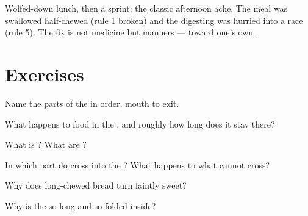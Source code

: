 \begin{example}\label{ex:g4:journey-of-food:ache}
Wolfed-down lunch, then a sprint: the classic afternoon
 ache. The meal was swallowed half-chewed (rule 1
broken) and the digesting  was hurried into a race
(rule 5). The fix is not medicine but manners --- toward
one's own .
\end{example}

\section{Exercises}

\begin{exercise}[$\star$]\label{exo:g4:journey-of-food:1}
Name the parts of the  in order, mouth to
exit.
\end{exercise}

\begin{exercise}[$\star$]\label{exo:g4:journey-of-food:2}
What happens to food in the , and roughly how long
does it stay there?
\end{exercise}

\begin{exercise}[$\star$]\label{exo:g4:journey-of-food:3}
What is ? What are ?
\end{exercise}

\begin{exercise}[$\star$]\label{exo:g4:journey-of-food:4}
In which part do  cross into the ? What
happens to what cannot cross?
\end{exercise}

\begin{exercise}[$\star$]\label{exo:g4:journey-of-food:5}
Why does long-chewed bread turn faintly sweet?
\end{exercise}

\begin{exercise}[$\star$]\label{exo:g4:journey-of-food:6}
Why is the  so long and so folded inside?
\end{exercise}

